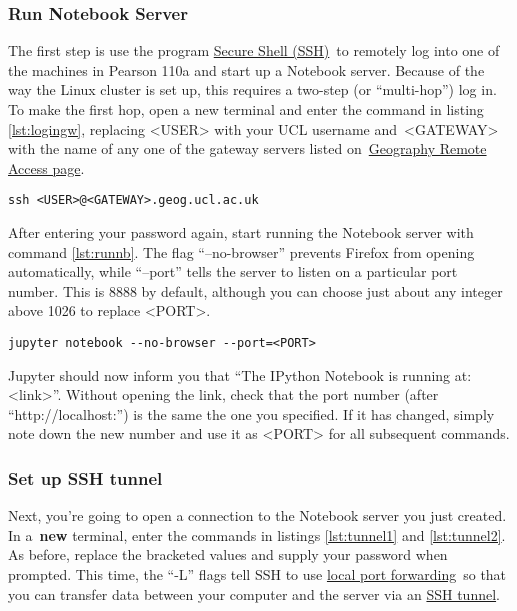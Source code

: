 \documentclass[a4paper]{article}
\begin{document}
\subsubsection{Run Notebook Server}
\label{sec:runnb}

The first step is use the program \href{http://linuxcommand.org/man_pages/ssh1.html}{Secure Shell (SSH)}~to remotely log into one of the machines in Pearson 110a and start up a Notebook server.
Because of the way the Linux cluster is set up, this requires a two-step (or ``multi-hop'') log in.
To make the first hop, open a new terminal and enter the command in listing \ref{lst:logingw}, replacing \textless{}USER\textgreater{} with your UCL username and~\textless{}GATEWAY\textgreater{} with the name of any one of the gateway servers listed on~\href{http://www.geog.ucl.ac.uk/resources/computer-support/linux-remote-access}{Geography Remote Access page}.

\begin{lstlisting}[caption={Login to gateway}, label={lst:logingw}]
ssh <USER>@<GATEWAY>.geog.ucl.ac.uk
\end{lstlisting}

After entering your password again, start running the Notebook server with command \ref{lst:runnb}.
The flag ``--no-browser'' prevents Firefox from opening automatically, while ``--port'' tells the server to listen on a particular port number.
This is 8888 by default, although you can choose just about any integer above 1026 to replace \textless{}PORT\textgreater{}.

\begin{lstlisting}[caption={Run Notebook server}, label={lst:runnb}]
jupyter notebook --no-browser --port=<PORT>
\end{lstlisting}

Jupyter should now inform you that ``The IPython Notebook is running at: \textless{}link\textgreater{}''.
Without opening the link, check that the port number (after ``http://localhost:'') is the same the one you specified.
If it has changed, simply note down the new number and use it as \textless{}PORT\textgreater{} for all subsequent commands.

\subsubsection{Set up SSH tunnel}

Next, you're going to open a connection to the Notebook server you just created.
In a~\textbf{new} terminal, enter the commands in listings \ref{lst:tunnel1} and \ref{lst:tunnel2}. As before, replace the bracketed values and supply your password when prompted.
This time, the ``-L'' flags tell SSH to use \href{https://help.ubuntu.com/community/SSH/OpenSSH/PortForwarding}{local port forwarding}~so that you can transfer data between your computer and the server via an \href{http://blog.trackets.com/2014/05/17/ssh-tunnel-local-and-remote-port-forwarding-explained-with-examples.html}{SSH tunnel}.
\end{document}
